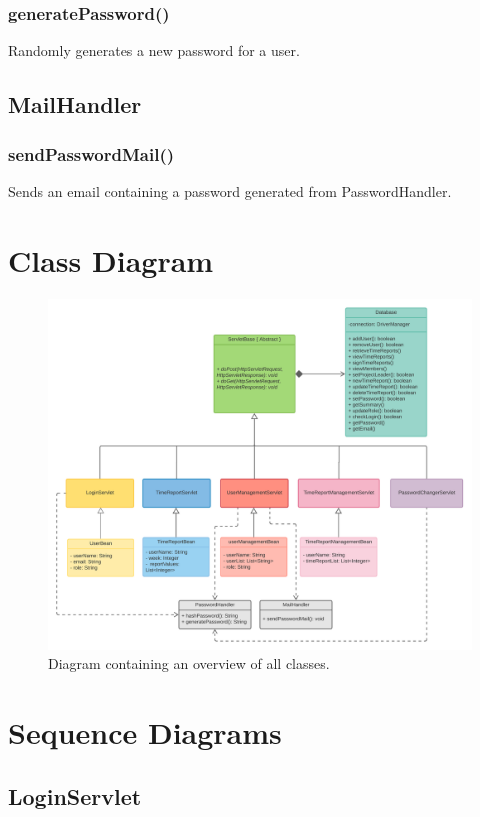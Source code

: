 \documentclass{article}
\begin{document}
\subsubsection{generatePassword()}
Randomly generates a new password for a user.
\subsection{MailHandler}
\subsubsection{sendPasswordMail()}
Sends an email containing a password generated from PasswordHandler.


\section{Class Diagram}

\begin{figure}[H]
    \centering
    \includegraphics[scale=0.5]{images/ClassDiagram.png}
    \caption{Diagram containing an overview of all classes.}
    \label{fig:classDiagram}
\end{figure}


\section{Sequence Diagrams}
\subsection{LoginServlet}
\end{document}

